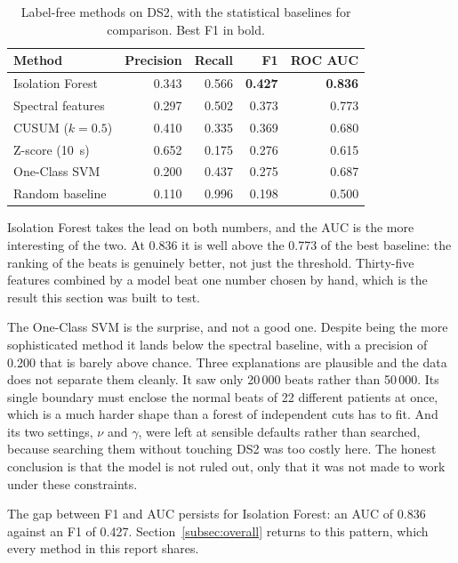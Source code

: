 \documentclass[a4paper, 12pt]{article}
\begin{document}
\begin{table}[htbp]
  \centering
  \small
  \caption{Label-free methods on DS2, with the statistical baselines for
  comparison. Best F1 in bold.}
  \label{tab:unsupresults}
  \begin{tabular}{@{}lrrrr@{}}
    \toprule
    \textbf{Method} & \textbf{Precision} & \textbf{Recall} & \textbf{F1}
      & \textbf{ROC AUC} \\
    \midrule
    Isolation Forest     & 0.343 & 0.566 & \textbf{0.427} & \textbf{0.836} \\
    Spectral features    & 0.297 & 0.502 & 0.373 & 0.773 \\
    CUSUM ($k=0.5$)      & 0.410 & 0.335 & 0.369 & 0.680 \\
    Z-score (\SI{10}{\second}) & 0.652 & 0.175 & 0.276 & 0.615 \\
    One-Class SVM        & 0.200 & 0.437 & 0.275 & 0.687 \\
    Random baseline      & 0.110 & 0.996 & 0.198 & 0.500 \\
    \bottomrule
  \end{tabular}
\end{table}

Isolation Forest takes the lead on both numbers, and the AUC is the more
interesting of the two. At \num{0.836} it is well above the \num{0.773} of the
best baseline: the ranking of the beats is genuinely better, not just the
threshold. Thirty-five features combined by a model beat one number chosen by
hand, which is the result this section was built to test.

The One-Class SVM is the surprise, and not a good one. Despite being the more
sophisticated method it lands below the spectral baseline, with a precision of
\num{0.200} that is barely above chance. Three explanations are plausible and the
data does not separate them cleanly. It saw only 20\,000 beats rather than
50\,000. Its single boundary must enclose the normal beats of 22 different
patients at once, which is a much harder shape than a forest of independent cuts
has to fit. And its two settings, $\nu$ and $\gamma$, were left at sensible
defaults rather than searched, because searching them without touching DS2 was too
costly here. The honest conclusion is that the model is not ruled out, only that
it was not made to work under these constraints.

The gap between F1 and AUC persists for Isolation Forest: an AUC of \num{0.836}
against an F1 of \num{0.427}. Section~\ref{subsec:overall} returns to this
pattern, which every method in this report shares.
\end{document}
